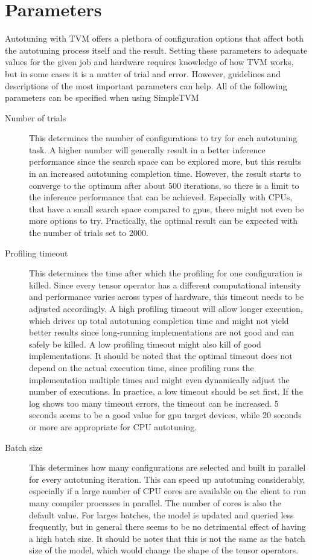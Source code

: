 \section{Parameters}
Autotuning with TVM offers a plethora of configuration options that affect both the autotuning process itself and the result. Setting these parameters to adequate values for the given job and hardware requires knowledge of how TVM works, but in some cases it is a matter of trial and error. However, guidelines and descriptions of the most important parameters can help. All of the following parameters can be specified when using SimpleTVM
\begin{description}
	\item[Number of trials] This determines the number of configurations to try for each autotuning task. A higher number will generally result in a better inference performance since the search space can be explored more, but this results in an increased autotuning completion time. However, the result starts to converge to the optimum after about 500 iterations, so there is a limit to the inference performance that can be achieved. Especially with CPUs, that have a small search space compared to \glspl{gpu}, there might not even be more options to try. Practically, the optimal result can be expected with the number of trials set to 2000.
	\item[Profiling timeout] This determines the time after which the profiling for one configuration is killed. Since every tensor operator has a different computational intensity and performance varies across types of hardware, this timeout needs to be adjusted accordingly. A high profiling timeout will allow longer execution, which drives up total autotuning completion time and might not yield better results since long-running implementations are not good and can safely be killed. A low profiling timeout might also kill of good implementations. It should be noted that the optimal timeout does not depend on the actual execution time, since profiling runs the implementation multiple times and might even dynamically adjust the number of executions. In practice, a low timeout should be set first. If the log shows too many timeout errors, the timeout can be increased. 5 seconds seems to be a good value for \gls{gpu} target devices, while 20 seconds or more are appropriate for CPU autotuning.
	\item[Batch size] This determines how many configurations are selected and built in parallel for every autotuning iteration. This can speed up autotuning considerably, especially if a large number of CPU cores are available on the client to run many compiler processes in parallel. The number of cores is also the default value. For larges batches, the model is updated and queried less frequently, but in general there seems to be no detrimental effect of having a high batch size. It should be notes that this is not the same as the batch size of the model, which would change the shape of the tensor operators.

\end{description}
